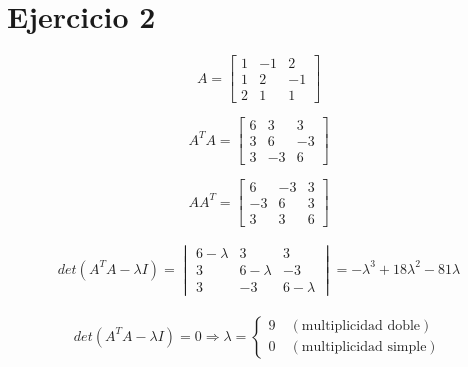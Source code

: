\documentclass[a4paper, spanish]{article}
\begin{document}
  \section{Ejercicio 2}


  \begin{equation}
    A =
    \begin{bmatrix}
      1 & -1 & 2\\
      1 & 2 & -1\\
      2 & 1 & 1
    \end{bmatrix}
  \end{equation}


  \begin{equation}
    A^TA =
    \begin{bmatrix}
      6 & 3 & 3 \\
      3 & 6 & -3 \\
      3 & -3 & 6
    \end{bmatrix}
  \end{equation}

  \begin{equation}
    AA^T =
    \begin{bmatrix}
      6 & -3 & 3 \\
      -3 & 6 & 3 \\
      3 & 3 & 6
    \end{bmatrix}
  \end{equation}


  \begin{align}
    det(A^T A - \lambda I)
    = \begin{vmatrix}
      6-\lambda & 3 & 3 \\
      3 & 6-\lambda & -3 \\
      3 & -3 & 6-\lambda
    \end{vmatrix}
    = -\lambda^3 + 18 \lambda ^ 2 - 81 \lambda
  \end{align}


  \begin{align}
    det(A^T A - \lambda I) = 0
    \Rightarrow
    \lambda =
    \begin{cases}
    9 \quad (\text{multiplicidad doble}) \\
    0 \quad (\text{multiplicidad simple})
    \end{cases}
  \end{align}
\end{document}
